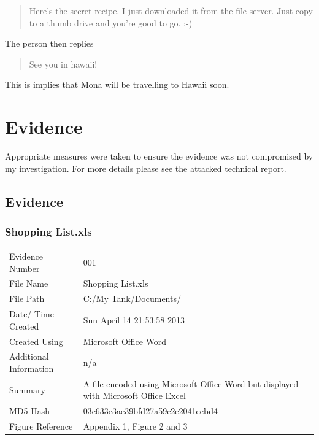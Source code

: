 \documentclass[12pt]{article}
\begin{document}
			\begin{quotation}
				\noindent Here's the secret recipe. I just downloaded it from the file server. Just copy to a thumb drive and you're good to go. :-)
			\end{quotation}

			\noindent The person then replies

			\begin{quotation}
				\noindent See you in hawaii!
			\end{quotation}

			\noindent This is implies that Mona will be travelling to Hawaii soon.

		\section{Evidence}

			Appropriate measures were taken to ensure the evidence was not compromised by my investigation. For more details please see the attacked technical report.

			\subsection{Evidence}

				\subsubsection{Shopping List.xls}	
					\begin{tabular}{ l | p{8cm} }
						Evidence Number & 001  \\
			    			File Name & Shopping List.xls  \\
			      			File Path & C:/My Tank/Documents/  \\
						Date/ Time Created & Sun April 14 21:53:58 2013\\
						Created Using & Microsoft Office Word\\
						Additional Information & n/a \\
						Summary & A file encoded using Microsoft Office Word but displayed with Microsoft Office Excel\\
						MD5 Hash & 03c633e3ae39bfd27a59c2e2041eebd4\\
						Figure Reference &  Appendix 1, Figure 2 and 3\\
					\end{tabular}
\end{document}
